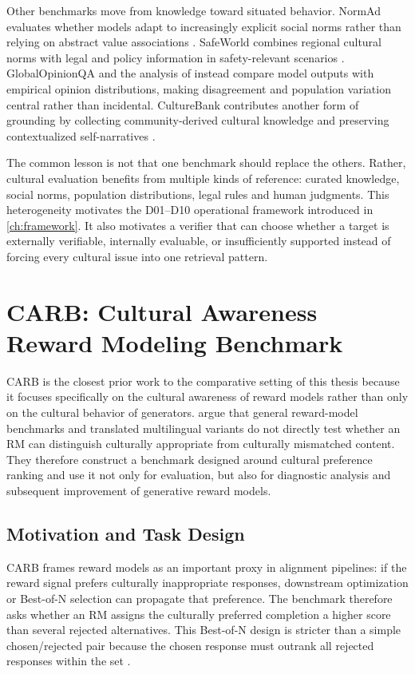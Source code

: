 Other benchmarks move from knowledge toward situated behavior. NormAd evaluates whether models adapt to increasingly explicit social norms rather than relying on abstract value associations \parencite{rao2025normad}. SafeWorld combines regional cultural norms with legal and policy information in safety-relevant scenarios \parencite{yin2024safeworld}. GlobalOpinionQA and the analysis of \textcite{tao2024culturalbias} instead compare model outputs with empirical opinion distributions, making disagreement and population variation central rather than incidental. CultureBank contributes another form of grounding by collecting community-derived cultural knowledge and preserving contextualized self-narratives \parencite{shi2024culturebank}.

The common lesson is not that one benchmark should replace the others. Rather, cultural evaluation benefits from multiple kinds of reference: curated knowledge, social norms, population distributions, legal rules and human judgments. This heterogeneity motivates the D01--D10 operational framework introduced in \cref{ch:framework}. It also motivates a verifier that can choose whether a target is externally verifiable, internally evaluable, or insufficiently supported instead of forcing every cultural issue into one retrieval pattern.

\section{CARB: Cultural Awareness Reward Modeling Benchmark}
\label{sec:carb}

CARB is the closest prior work to the comparative setting of this thesis because it focuses specifically on the cultural awareness of reward models rather than only on the cultural behavior of generators. \textcite{zhang2026carb} argue that general reward-model benchmarks and translated multilingual variants do not directly test whether an RM can distinguish culturally appropriate from culturally mismatched content. They therefore construct a benchmark designed around cultural preference ranking and use it not only for evaluation, but also for diagnostic analysis and subsequent improvement of generative reward models.

\subsection{Motivation and Task Design}

CARB frames reward models as an important proxy in alignment pipelines: if the reward signal prefers culturally inappropriate responses, downstream optimization or Best-of-N selection can propagate that preference. The benchmark therefore asks whether an RM assigns the culturally preferred completion a higher score than several rejected alternatives. This Best-of-N design is stricter than a simple chosen/rejected pair because the chosen response must outrank all rejected responses within the set \parencite{zhang2026carb}.

